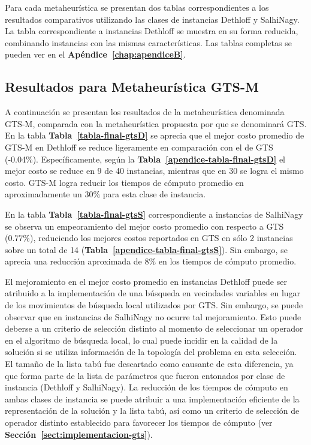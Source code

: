 Para cada metaheurística se presentan dos tablas correspondientes a los resultados comparativos utilizando las clases de instancias Dethloff y SalhiNagy. La tabla correspondiente a instancias Dethloff se muestra en su forma re\-du\-ci\-da, combinando instancias con las mismas características. Las tablas completas se pueden ver en el \textbf{Apéndice~\ref{chap:apendiceB}}.\\

\subsection{Resultados para Metaheurística GTS-M}

A continuación se presentan los resultados de la metaheurística denominada GTS-M, comparada con la metaheurística propuesta por \cite{gts} que se denominará GTS.\\

En la tabla \textbf{Tabla~\ref{tabla-final-gtsD}} se aprecia que el mejor costo promedio de GTS-M en Dethloff se reduce ligeramente en comparación con el de GTS (-0.04\%). Específicamente, según la \textbf{Tabla~\ref{apendice-tabla-final-gtsD}} el mejor costo se reduce en 9 de 40 instancias, mientras que en 30 se logra el mismo costo. GTS-M logra reducir los tiempos de cómputo promedio en aproximadamente un 30\% para esta clase de instancia.

En la tabla \textbf{Tabla~\ref{tabla-final-gtsS}} correspondiente a instancias de SalhiNagy se observa un empeoramiento del mejor costo promedio con respecto a GTS (0.77\%), reduciendo los mejores costos reportados en GTS en sólo 2 instancias sobre un total de 14 (\textbf{Tabla~\ref{apendice-tabla-final-gtsS}}). Sin embargo, se aprecia una reducción aproximada de 8\% en los tiempos de cómputo promedio.

El mejoramiento en el mejor costo promedio en instancias Dethloff puede ser atribuido a la implementación de una búsqueda en vecindades variables en lugar de los movimientos de búsqueda local utilizados por GTS. Sin embargo, se puede observar que en instancias de SalhiNagy no ocurre tal mejoramiento. Esto puede deberse a un criterio de selección distinto al momento de seleccionar un operador en el algoritmo de búsqueda local, lo cual puede incidir en la calidad de la solución si se utiliza información de la topología del problema en esta selección. El tamaño de la lista tabú fue descartado como causante de esta diferencia, ya que forma parte de la lista de parámetros que fueron entonados por clase de instancia (Dethloff y SalhiNagy). La reducción de los tiempos de cómputo en ambas clases de instancia se puede atribuir a una implementación eficiente de la representación de la solución y la lista tabú, así como un criterio de selección de operador distinto establecido para favorecer los tiempos de cómputo (ver \textbf{ Sección~\ref{sect:implementacion-gts}}).\\

